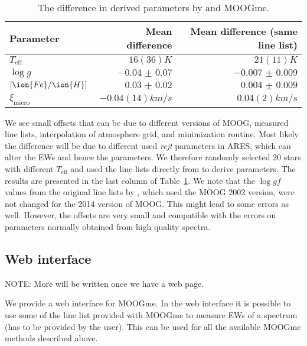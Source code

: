 \documentclass{aa}
\begin{document}
\begin{table}[htb!]
    \caption{The difference in derived parameters by \citet{Sousa2011}
    and MOOGme.}
    \label{tab:MOOGmeTest}
    \centering
    \begin{tabular}{lrr}
      \hline\hline
      Parameter             &  Mean difference         & Mean difference (same line list) \\
      \hline
      $T_\mathrm{eff}$      &  $   {16(36)}{K}$        & $   {21(11)}{K}$                 \\
      $\log g$              &  $\num{-0.04(7)}$        & $\num{-0.007(9)}$                \\
      $[\ion{Fe}/\ion{H}]$  &  $\num{0.03(2)}$         & $\num{0.004(9)}$                 \\
      $\xi_\mathrm{micro}$  &  $   {-0.04(14)}{km/s}$  & $   {0.04(2)}{km/s}$             \\
      \hline
    \end{tabular}
\end{table}

We see small offsets that can be due to different versions of MOOG, measured
line lists, interpolation of atmosphere grid, and minimization routine. Most
likely the difference will be due to different used \emph{rejt} parameters
in ARES, which can alter the EWs and hence the parameters. We therefore randomly
selected 20 stars with different $T_\mathrm{eff}$ and used the line lists
directly from \citet{Sousa2011} to derive parameters. The results are
presented in the last column of Table~\ref{tab:MOOGmeTest}. We note that
the $\log gf$ values from the original line lists by \citet{Sousa2011}, which
used the MOOG 2002 version, were not changed for the 2014 version of MOOG.
This might lead to some errors as well. However, the offsets are very small
and compatible with the errors on parameters normally obtained from high
quality spectra.


\subsection{Web interface}
\label{sub:Web interface}
NOTE: More will be written once we have a web page.

We provide a web interface for MOOGme. In the web interface it is
possible to use some of the line list provided with MOOGme to
measure EWs of a spectrum (has to be provided by the user). This
can be used for all the available MOOGme methods described above.
\end{document}
